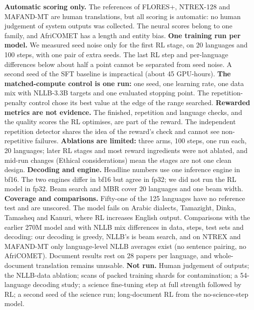 \textbf{Automatic scoring only.} The references of FLORES+, NTREX-128 and MAFAND-MT are human translations, but all scoring is automatic: no human judgement of system outputs was collected. The neural scores belong to one family, and AfriCOMET has a length and entity bias.
\textbf{One training run per model.} We measured seed noise only for the first RL stage, on 20 languages and 100 steps, with one pair of extra seeds. The last RL step and per-language differences below about half a point cannot be separated from seed noise. A second seed of the SFT baseline is impractical (about 45 GPU-hours).
\textbf{The matched-compute control is one run:} one seed, one learning rate, one data mix with NLLB-3.3B targets and one evaluated stopping point. The repetition-penalty control chose its best value at the edge of the range searched.
\textbf{Rewarded metrics are not evidence.} The finished, repetition and language checks, and the quality scores the RL optimises, are part of the reward. The independent repetition detector shares the idea of the reward's check and cannot see non-repetitive failures.
\textbf{Ablations are limited:} three arms, 100 steps, one run each, 20 languages; later RL stages and most reward ingredients were not ablated, and mid-run changes (Ethical considerations) mean the stages are not one clean design.
\textbf{Decoding and engine.} Headline numbers use one inference engine in bf16. The two engines differ in bf16 but agree in fp32; we did not run the RL model in fp32. Beam search and MBR cover 20 languages and one beam width.
\textbf{Coverage and comparisons.} Fifty-one of the 125 languages have no reference test and are unscored. The model fails on Arabic dialects, Tamazight, Dinka, Tamasheq and Kanuri, where RL increases English output. Comparisons with the earlier 270M model and with NLLB mix differences in data, steps, test sets and decoding: our decoding is greedy, NLLB's is beam search, and on NTREX and MAFAND-MT only language-level NLLB averages exist (no sentence pairing, no AfriCOMET). Document results rest on 28 papers per language, and whole-document translation remains unusable.
\textbf{Not run.} Human judgement of outputs; the NLLB-data ablation; scans of packed training shards for contamination; a 54-language decoding study; a science fine-tuning step at full strength followed by RL; a second seed of the science run; long-document RL from the no-science-step model.
